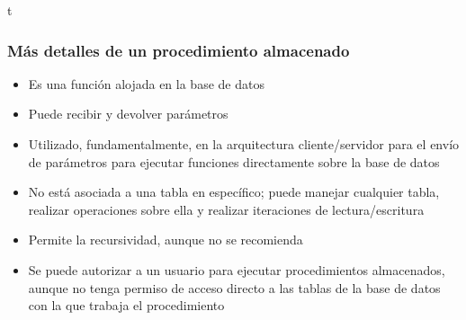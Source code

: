 \documentclass[
	10pt, %
	aspectratio=169, %
]{beamer}
\begin{document}

\begin{frame}{t}
	
	\frametitle{Más detalles de un procedimiento almacenado}
	
	\begin{itemize}
		
		\item Es una función alojada en la base de datos
		
		\pause
		
		\item Puede recibir y devolver parámetros
		
		\pause
		
		\item Utilizado, fundamentalmente, en la arquitectura cliente/servidor para el envío de parámetros para ejecutar funciones directamente sobre la base de datos
		
		\pause
		
		\item No está asociada a una tabla en específico; puede manejar cualquier tabla, realizar operaciones sobre ella y realizar iteraciones de lectura/escritura
		
		\pause
		
		\item Permite la recursividad, aunque no se recomienda
		
		\pause
		
		\item Se puede autorizar a un usuario para ejecutar procedimientos almacenados, aunque no tenga permiso de acceso directo a las tablas de la base de datos con la que trabaja el procedimiento
		
	\end{itemize}
	
\end{frame}

\end{document}
